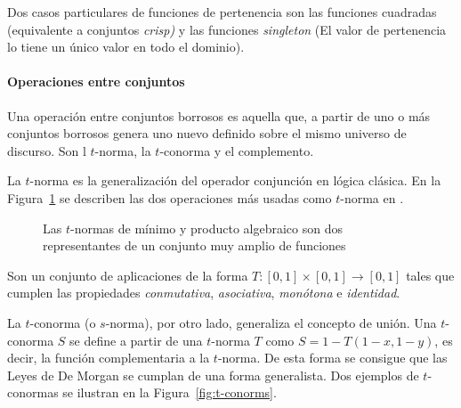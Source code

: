 Dos casos particulares de funciones de pertenencia son las funciones cuadradas (equivalente a conjuntos \textit{crisp)} y las funciones \textit{singleton} (El valor de pertenencia lo tiene un único valor en todo el dominio).

\paragraph{Operaciones entre conjuntos}

Una operación entre conjuntos borrosos es aquella que, a partir de uno o más conjuntos borrosos genera uno nuevo definido sobre el mismo universo de discurso. Son l $t$-norma, la $t$-conorma y el complemento.

La $t$-norma es la generalización del operador conjunción en lógica clásica. En la Figura~\ref{fig:t-norms} se describen las dos operaciones más usadas como $t$-norma en .

\begin{figure}
	\centering
	\qquad
	\caption[$t$-normas de mínimo y producto algebraico.]{Las $t$-normas de mínimo y producto algebraico son dos representantes de un conjunto muy amplio de funciones}
	\label{fig:t-norms}
\end{figure}

Son un conjunto de aplicaciones de la forma $T: [0, 1] \times [0, 1] \rightarrow [0, 1]$ tales que cumplen las propiedades \textit{conmutativa}, \textit{asociativa}, \textit{monótona} e \textit{identidad}.

La $t$-conorma (o $s$-norma), por otro lado, generaliza el concepto de unión. Una $t$-conorma $S$ se define a partir de una $t$-norma $T$ como $S = 1 - T(1-x, 1-y)$, es decir, la función complementaria a la $t$-norma. De esta forma se consigue que las Leyes de De Morgan se cumplan de una forma generalista. Dos ejemplos de $t$-conormas se ilustran en la Figura~\ref{fig:t-conorms}.

